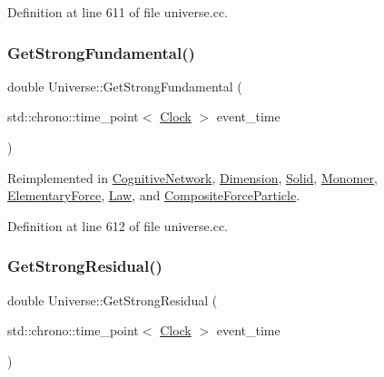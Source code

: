 Definition at line 611 of file universe.\+cc.

\mbox{\label{class_universe_ab44daccba01ee7e3cf9b50bba83dd19e}} 
\subsubsection{\texorpdfstring{Get\+Strong\+Fundamental()}{GetStrongFundamental()}}
{\footnotesize\ttfamily double Universe\+::\+Get\+Strong\+Fundamental (\begin{DoxyParamCaption}\item[{std\+::chrono\+::time\+\_\+point$<$ \mbox{\hyperlink{universe_8h_a0ef8d951d1ca5ab3cfaf7ab4c7a6fd80}{Clock}} $>$}]{event\+\_\+time }\end{DoxyParamCaption})\hspace{0.3cm}{\ttfamily [virtual]}}



Reimplemented in \mbox{\hyperlink{class_cognitive_network_a942ca90561fedae46136de620accbfea}{Cognitive\+Network}}, \mbox{\hyperlink{class_dimension_ad0d067d7f9dc4841b0ad280979ebe7af}{Dimension}}, \mbox{\hyperlink{class_solid_ab3a972354b25ad1bbe8c3f3e7638e24c}{Solid}}, \mbox{\hyperlink{class_monomer_a4bc8b39086260e26a196b28b4fc6667f}{Monomer}}, \mbox{\hyperlink{class_elementary_force_a0974d6537c07dac2453d2a607324fa21}{Elementary\+Force}}, \mbox{\hyperlink{class_law_afcdbea76524e5a52691fff7b526971e9}{Law}}, and \mbox{\hyperlink{class_composite_force_particle_abc8597f3b4f7cf755ab4618bd624b046}{Composite\+Force\+Particle}}.



Definition at line 612 of file universe.\+cc.

\mbox{\label{class_universe_af0f4b81950061e63c2855eb40957a5b1}} 
\subsubsection{\texorpdfstring{Get\+Strong\+Residual()}{GetStrongResidual()}}
{\footnotesize\ttfamily double Universe\+::\+Get\+Strong\+Residual (\begin{DoxyParamCaption}\item[{std\+::chrono\+::time\+\_\+point$<$ \mbox{\hyperlink{universe_8h_a0ef8d951d1ca5ab3cfaf7ab4c7a6fd80}{Clock}} $>$}]{event\+\_\+time }\end{DoxyParamCaption})\hspace{0.3cm}{\ttfamily [virtual]}}



